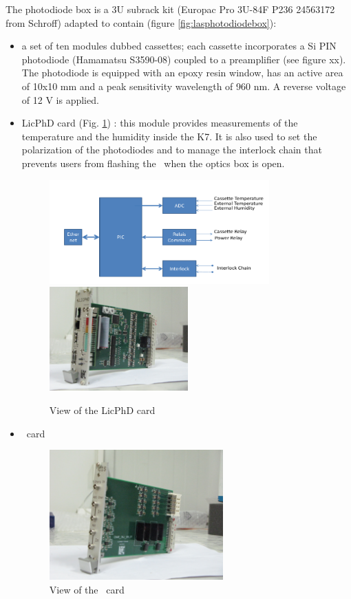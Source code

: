 The photodiode box is a 3U subrack kit (Europac Pro 3U-84F P236 24563172 from Schroff) adapted to contain (figure \ref{fig:lasphotodiodebox}):
\begin{itemize}
\item a set of ten modules dubbed cassettes; each cassette incorporates a Si PIN photodiode (Hamamatsu S3590-08) coupled to a preamplifier (see figure xx). The photodiode is equipped with an epoxy resin window, has an active area of 10x10 mm and a peak sensitivity wavelength of 960 nm. A reverse voltage of 12 V is applied.
\item LicPhD card (Fig. \ref{fig:laslicphd}) : this module provides measurements of  the temperature and the humidity inside the K7. It is also used to set the polarization of the photodiodes and to
manage the interlock chain that prevents users from flashing the \laser~when the optics box is open.

\begin{figure}[htbp]
\centering
\includegraphics[height=4cm]{figures/licphd_scheme.pdf}
\includegraphics[height=4cm]{figures/licphd.JPG}
\caption{View of the LicPhD card}\label{fig:laslicphd}
\end{figure}

\item \charinjsplit~card


\begin{figure}[htbp]
\centering
\includegraphics[height=5cm]{figures/cis.JPG}
\caption{View of the  \charinjsplit~card}\label{fig:lascis}
\end{figure}


\end{itemize}
